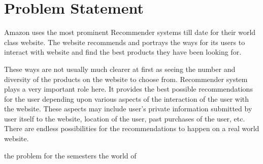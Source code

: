 \section{Problem Statement}
Amazon uses the most prominent Recommender systems till date for their world class website. The website recommends and portrays the ways for its users to interact with website and find the best products they have been looking for.

These ways are not usually much clearer at first as seeing the number and diversity of the products on the website to choose from. Recommender system plays a very important role here. It provides the best possible recommendations for the user depending upon various aspects of the interaction of the user with the website. These aspects may include user's private information submitted by user itself to the website, location of the user, past purchases of the user, etc. There are endless possibilities for the recommendations to happen on a real world website.

the problem for the semesters the world of 




